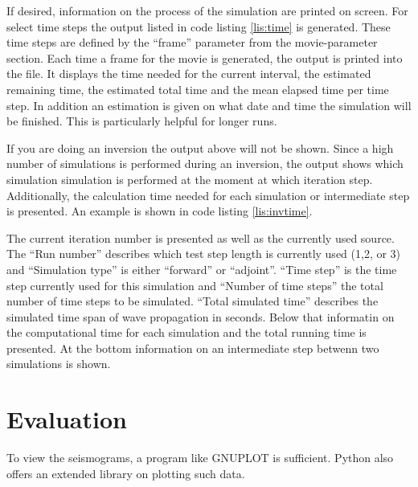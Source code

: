 		If desired, information on the process of the simulation are printed on screen. For select time steps the output listed in code listing \ref{lis:time} is generated. These time steps are defined by the ``frame'' parameter from the movie-parameter section. Each time a frame for the movie is generated, the output is printed into the file.
		It displays the time needed for the current interval, the estimated remaining time, the estimated total time and the mean elapsed time per time step. In addition an estimation is given on what date and time the simulation will be finished. This is particularly helpful for longer runs. 
		
		
    
    	If you are doing an inversion the output above will not be shown. Since a high number of simulations is performed during an inversion, the output shows which simulation simulation is performed at the moment at which iteration step. Additionally, the calculation time needed for each simulation or intermediate step is presented. An example is shown in code listing \ref{lis:invtime}.
        	
      	
    
    The current iteration number is presented as well as the currently used source. The ``Run number'' describes which test step length is currently used (1,2, or 3) and ``Simulation type'' is either ``forward'' or ``adjoint''. ``Time step'' is the time step currently used for this simulation and ``Number of time steps'' the total number of time steps to be simulated. ``Total simulated time'' describes the simulated time span of wave propagation in seconds. Below that informatin on the computational time for each simulation and the total running time is presented. At the bottom information on an intermediate step betwenn two simulations is shown.  
    
    \section{Evaluation}
    \label{sec:eval}
    	To view the seismograms, a program like GNUPLOT is sufficient. Python also offers an extended library on plotting such data.
    	
